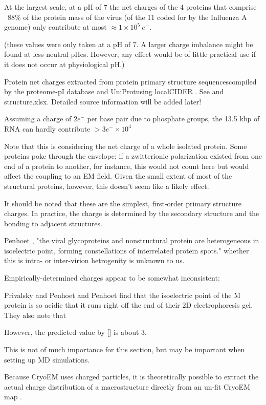 \documentclass[paper.tex]{subfiles}
\begin{document}
At the largest scale, at a pH of 7 the net charges of the 4 proteins that comprise ~88\% of the protein mass\cite{Quantitative1981} of the virus (of the 11 coded for by the Influenza A genome) only contribute at most  $\approx 1 \times 10^5\  e^-$.

(these values were only taken at a pH of 7. A larger charge imbalance might be found at less neutral pHes. However, any effect would be of little practical use if it does not occur at physiological pH.)

\begin{sidenote}
Protein net charges extracted from protein primary structure sequences\footnotemark compiled by the proteome-pI database \cite{ProteomepI2017} and UniProt\footnotemark using localCIDER \cite{CIDER2017}. See  and structure.xlsx. Detailed source information will be added later!
\end{sidenote}
Assuming a charge of $2e^-$ per base pair due to phosphate groups, the 13.5 kbp of RNA can hardly contribute $> 3e^- \times10^4$


Note that this is considering the net charge of a whole isolated protein. Some proteins poke through the envelope; if a zwitterionic polarization existed from one end of a protein to another, for instance, this would not count here but would affect the coupling to an EM field. Given the small extent of most of the structural proteins, however, this doesn't seem like a likely effect.

\begin{sidenote}
	It should be noted that these are the simplest, first-order primary structure charges. In practice, the charge is determined by the secondary structure and the bonding to adjacent structures.
	
	 Penhoet \cite{Structurea}, "the viral glycoproteins and nonstructural protein are heterogeneous in isoelectric point, forming constellations of interrelated protein spots." whether this is intra- or inter-virion hetrogenity is unknown to us. 
	
	Empirically-determined charges appear to be somewhat inconsistent:
	
	Privalsky and Penhoet \cite{Influenza1978} and Penhoet \cite{Structurea} find that the isoelectric point of the M protein is so acidic that it runs right off the end of their 2D electrophoresis gel. They also note that 
	
	However, the predicted value by [] is about 3.
	
	This is not of much importance for this section, but may be important when setting up MD simulations.
	
	Because CryoEM uses charged particles, it is theoretically possible to extract the actual charge distribution of a macrostructure directly from an un-fit CryoEM map \cite{Identification2018}. 
\end{sidenote}
\end{document}
